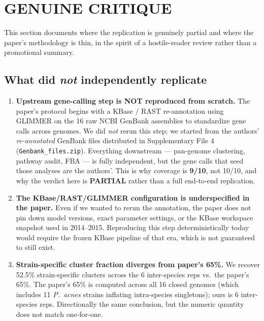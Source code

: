 \documentclass[11pt]{article}
\begin{document}
\section{GENUINE CRITIQUE}
This section documents where the replication is genuinely partial and where the
paper's methodology is thin, in the spirit of a hostile-reader review rather than
a promotional summary.

\subsection{What did \emph{not} independently replicate}
\begin{enumerate}
\item \textbf{Upstream gene-calling step is NOT reproduced from scratch.} The
      paper's protocol begins with a KBase / RAST re-annotation using GLIMMER on
      the 16 raw NCBI GenBank assemblies to standardize gene calls across
      genomes. We did \emph{not} rerun this step; we started from the authors'
      \emph{re-annotated} GenBank files distributed in Supplementary File 4
      (\texttt{Genbank\_files.zip}). Everything downstream --- pan-genome
      clustering, pathway audit, FBA --- is fully independent, but the gene calls
      that seed those analyses are the authors'. This is why coverage is
      \textbf{9/10}, not 10/10, and why the verdict here is \textbf{PARTIAL}
      rather than a full end-to-end replication.
\item \textbf{The KBase/RAST/GLIMMER configuration is underspecified in the
      paper.} Even if we wanted to rerun the annotation, the paper does not pin
      down model versions, exact parameter settings, or the KBase workspace
      snapshot used in 2014--2015. Reproducing this step deterministically
      today would require the frozen KBase pipeline of that era, which is not
      guaranteed to still exist.
\item \textbf{Strain-specific cluster fraction diverges from paper's 65\%.} We
      recover 52.5\% strain-specific clusters across the 6 inter-species reps
      vs.\ the paper's 65\%. The paper's 65\% is computed across all 16 closed
      genomes (which includes 11 \emph{P.\ acnes} strains inflating intra-species
      singletons); ours is 6 inter-species reps. Directionally the same
      conclusion, but the numeric quantity does not match one-for-one.
\end{enumerate}
\end{document}

